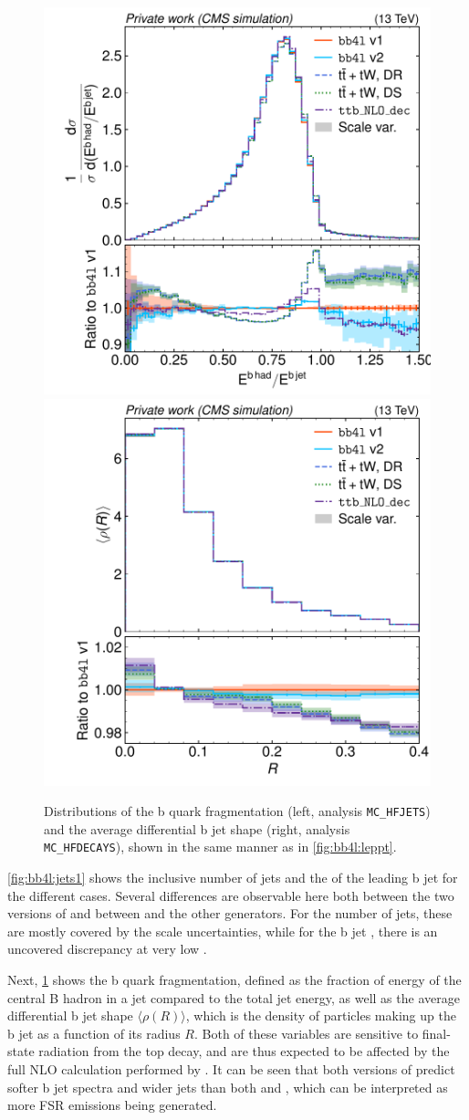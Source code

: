 \begin{figure}[tp]
    \centering
    \includegraphics[width=0.49 \textwidth]{figures/bb4l/generators/MC_HFJETS_efracB.pdf}
    \hfill
    \includegraphics[width=0.49 \textwidth]{figures/bb4l/generators/MC_HFDECAYS_avg_rho_B_jet.pdf}
    \caption{Distributions of the b quark fragmentation (left, \rivet analysis \texttt{MC\_HFJETS}) and the average differential b jet shape (right, \rivet analysis \texttt{MC\_HFDECAYS}), shown in the same manner as in \cref{fig:bb4l:leppt}.}
    \label{fig:bb4l:jets2}
\end{figure}

\cref{fig:bb4l:jets1} shows the inclusive number of jets and the \pt of the leading b jet for the different cases. Several differences are observable here both between the two versions of \bbfourl and between \bbfourl and the other generators. For the number of jets, these are mostly covered by the scale uncertainties, while for the b jet \pt, there is an uncovered discrepancy at very low \pt.

Next, \cref{fig:bb4l:jets2} shows the b quark fragmentation, defined as the fraction of energy of the central B hadron in a jet compared to the total jet energy, as well as the average differential b jet shape $\langle \rho (R) \rangle$, which is the density of particles making up the b jet as a function of its radius $R$. Both of these variables are sensitive to final-state radiation from the top decay, and are thus expected to be affected by the full NLO calculation performed by \bbfourl. It can be seen that both versions of \bbfourl predict softer b jet spectra and wider jets than both \tttWsum and \ttb, which can be interpreted as more FSR emissions being generated.

